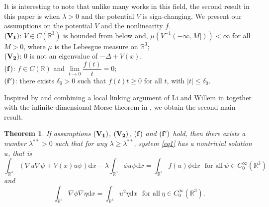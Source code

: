 \documentclass[12pt]{amsart}
\numberwithin{equation}{section}
\newtheorem{theorem}{Theorem}[section]
\theoremstyle{definition}
\begin{document}
It is interesting to note that unlike many works in this field, the second result in this paper is when $\lambda>0$ and the potential $V$ is sign-changing. We present our assumptions on the potential $V$ and the nonlinearity $f$.\\
${\bf(V_1)}$: $V\in C(\mathbb{R}^3)$ is bounded from below and, $\mu(V^{-1}(-\infty,M]))<\infty$ for all $M>0$, where $\mu$ is the Lebesgue measure on $\mathbb{R}^3$;\\
${\bf(V_2)}$: $0$ is not an eigenvalue of $-\Delta+V(x)$.\\
${\bf (f)}$: $f\in C(\mathbb{R})$ and
$\displaystyle{\lim\limits_{t\to0}\dfrac{f(t)}{t}}=0;$\\
${\bf (f')}$: there exists $\delta_0>0$ such that
$f(t)t\geq 0$ for all $t$, with $|t|\leq\delta_0.$

Inspired by \cite{MR3656292,MR3843290} and combining a local linking argument of Li and Willem in \cite{MR1312028} 
together with the infinite-dimensional Morse theorem in \cite{MR1196690}, we obtain the second main result.

\begin{theorem}\label{thm2}
 If assumptions ${\bf (V_1)}$, ${\bf (V_2)}$, ${\bf (f)}$ and ${\bf (f')}$ hold, then there exists  a number $\lambda^{**}>0$ such that for any $\lambda\ge \lambda^{**}$, system \eqref{eq1} has a nontrivial solution $u$, that is
	\begin{equation*}
			\int_{\mathbb R^3}\left(\nabla u\nabla\psi +V(x)u\psi \right)\text{d}x-\lambda \int_{\mathbb R^3} \phi u\psi \text{d}x=\int_{\mathbb R^3}f(u)\psi \text{d}x\ \ ~\text{for~all}~\psi\in C_0^\infty(\mathbb R^3)
	\end{equation*}
and
	\begin{equation*}
	\int_{\mathbb R^3}\nabla \phi\nabla \eta \text{d}x=\int_{\mathbb R^3}u^2\eta \text{d}x\ \ ~\text{for~all}~\eta\in C_0^\infty(\mathbb R^3).
\end{equation*}
\end{theorem}
\end{document}
